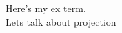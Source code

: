 \documentclass[class=report , crop=false, openany, titlepage, twoside, multi={itemize, figure, verbatim}, float=false]{standalone}
\begin{document}
Here's my \gls{ex} term.\\
Lets talk about \gls{projection}
\clearpage

\printglossaries
\end{document}
